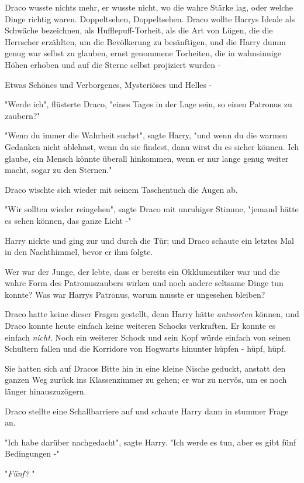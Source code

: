 {Draco wusste nichts mehr, er wusste nicht, wo die wahre Stärke lag, oder welche Dinge richtig waren. Doppeltsehen, Doppeltsehen. Draco wollte Harrys Ideale als Schwäche bezeichnen, als Hufflepuff-Torheit, als die Art von Lügen, die die Herrscher erzählten, um die Bevölkerung zu besänftigen, und die Harry dumm genug war selbst zu glauben, ernst genommene Torheiten, die in wahnsinnige Höhen erhoben und auf die Sterne selbst projiziert wurden -

Etwas Schönes und Verborgenes, Mysteriöses und Helles -

"Werde ich", flüsterte Draco, "eines Tages in der Lage sein, so einen Patronus zu zaubern?"

"Wenn du immer die Wahrheit suchst", sagte Harry, "und wenn du die warmen Gedanken nicht ablehnst, wenn du sie findest, dann wirst du es sicher können. Ich glaube, ein Mensch könnte überall hinkommen, wenn er nur lange genug weiter macht, sogar zu den Sternen."

Draco wischte sich wieder mit seinem Taschentuch die Augen ab.

"Wir sollten wieder reingehen", sagte Draco mit unruhiger Stimme, "jemand hätte es sehen können, das ganze Licht -"

Harry nickte und ging zur und durch die Tür; und Draco schaute ein letztes Mal in den Nachthimmel, bevor er ihm folgte.

Wer war der Junge, der lebte, dass er bereits ein Okklumentiker war und die wahre Form des Patronuszaubers wirken und noch andere seltsame Dinge tun konnte? Was war Harrys Patronus, warum musste er ungesehen bleiben?

Draco hatte keine dieser Fragen gestellt, denn Harry hätte \emph{antworten} können, und Draco konnte heute einfach keine weiteren Schocks verkraften. Er konnte es einfach \emph{nicht}. Noch ein weiterer Schock und sein Kopf würde einfach von seinen Schultern fallen und die Korridore von Hogwarts hinunter hüpfen - hüpf, hüpf.

Sie hatten sich auf Dracos Bitte hin in eine kleine Nische geduckt, anstatt den ganzen Weg zurück ins Klassenzimmer zu gehen; er war zu nervös, um es noch länger hinauszuzögern.

Draco stellte eine Schallbarriere auf und schaute Harry dann in stummer Frage an.

"Ich habe darüber nachgedacht", sagte Harry. "Ich werde es tun, aber es gibt fünf Bedingungen -"

"\emph{Fünf?} "

}
